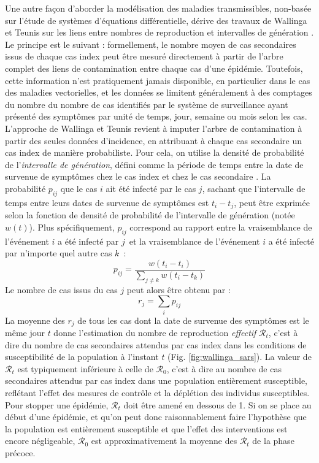 Une autre façon d'aborder la modélisation des maladies transmissibles, non-basée sur l'étude de systèmes d'équations différentielle, dérive des travaux de Wallinga et Teunis sur les liens entre nombres de reproduction et intervalles de génération \cite{wallinga2004different}.
Le principe est le suivant : formellement, le nombre moyen de cas secondaires issus de chaque cas index peut être mesuré directement à partir de l'arbre complet des liens de contamination entre chaque cas d'une épidémie.
Toutefois, cette information n'est pratiquement jamais disponible, en particulier dans le cas des maladies vectorielles, et les données se limitent généralement à des comptages du nombre du nombre de cas identifiés par le système de surveillance ayant présenté des symptômes par unité de temps, jour, semaine ou mois selon les cas.
L'approche de Wallinga et Teunis revient à imputer l'arbre de contamination à partir des seules données d'incidence, en attribuant à chaque cas secondaire un cas index de manière probabiliste.
Pour cela, on utilise la densité de probabilité de l'{\em intervalle de génération}, défini comme la période de temps entre la date de survenue de symptômes chez le cas index et chez le cas secondaire \cite{svensson_note_2007}.
La probabilité $p_{ij}$ que le cas $i$ ait été infecté par le cas $j$, sachant que l'intervalle de temps entre leurs dates de survenue de symptômes est $t_i-t_j$, peut être exprimée selon la fonction de densité de probabilité de l'intervalle de génération (notée $w(t)$). 
Plus spécifiquement, $p_{ij}$ correspond au rapport entre la vraisemblance de l'événement \guillemotleft$i$ a été infecté par $j$\guillemotright\ et la vraisemblance de l'événement \guillemotleft$i$ a été infecté par n'importe quel autre cas $k$\guillemotright\ :
\begin{equation}
p_{ij} = \frac{w(t_i-t_i)}{\sum_{j\neq k}w(t_i-t_k)}
\end{equation}
Le nombre de cas issus du cas $j$ peut alors être obtenu par :
\begin{equation}
r_j = \sum_ip_{ij}
\end{equation}
La moyenne des $r_j$ de tous les cas dont la date de survenue des symptômes est le même jour $t$ donne l'estimation du nombre de reproduction {\em effectif} $\mathcal{R}_t$, c'est à dire du nombre de cas secondaires attendus par cas index dans les conditions de susceptibilité de la population à l'instant $t$ (Fig. \ref{fig:wallinga_sars}).
La valeur de $\mathcal{R}_t$ est typiquement inférieure à celle de  $\mathcal{R}_0$, c'est à dire au nombre de cas secondaires attendus par cas index dans une population entièrement susceptible, reflétant l'effet des mesures de contrôle et la déplétion des individus susceptibles.
Pour stopper une épidémie,  $\mathcal{R}_t$ doit être amené en dessous de 1. 
Si on se place au début d'une épidémie, et qu'on peut donc raisonnablement faire l'hypothèse que la population est entièrement susceptible et que l'effet des interventions est encore négligeable, $\mathcal{R}_0$ est approximativement la moyenne des $\mathcal{R}_t$ de la phase précoce.

